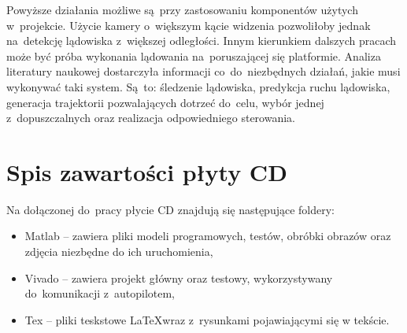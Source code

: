 Powyższe działania możliwe są~przy zastosowaniu komponentów użytych w~projekcie. 
Użycie kamery o~większym kącie widzenia pozwoliłoby jednak na~detekcję lądowiska z~większej odległości.
Innym kierunkiem dalszych pracach może być próba wykonania lądowania na~poruszającej się platformie. 
Analiza literatury naukowej dostarczyła informacji co~do~niezbędnych działań, jakie musi wykonywać taki system. 
Są~to: śledzenie lądowiska, predykcja ruchu lądowiska, generacja trajektorii pozwalających dotrzeć do~celu, wybór jednej z~dopuszczalnych oraz realizacja odpowiedniego sterowania.

\appendix
\chapter{Spis zawartości płyty CD}
Na dołączonej do~pracy płycie CD znajdują się następujące foldery:
\begin{itemize}
	\item Matlab -- zawiera pliki modeli programowych, testów, obróbki obrazów oraz zdjęcia niezbędne do ich uruchomienia,
	\item Vivado -- zawiera projekt główny oraz testowy, wykorzystywany do~komunikacji z~autopilotem,
	\item Tex -- pliki teskstowe \LaTeX wraz z~rysunkami pojawiającymi się w tekście.
\end{itemize}
